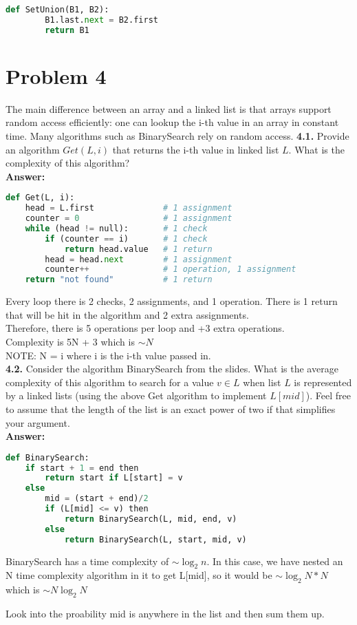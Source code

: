 \documentclass{article}
\begin{document}
\begin{lstlisting}[language=Python]
    def SetUnion(B1, B2):
        B1.last.next = B2.first
        return B1
\end{lstlisting}

\section*{Problem 4}
The main difference between an array and a linked list is that arrays support random access
efficiently: one can lookup the i-th value in an array in constant time. Many algorithms such as BinarySearch rely on random access.
 \textbf{4.1.} Provide an algorithm $Get(L,i)$ that returns the i-th value in linked list $L$. What is the complexity of this algorithm?\\

\noindent \textbf{Answer: }

\begin{lstlisting}[language=Python]
def Get(L, i):
    head = L.first              # 1 assignment
    counter = 0                 # 1 assignment
    while (head != null):       # 1 check
        if (counter == i)       # 1 check
            return head.value   # 1 return
        head = head.next        # 1 assignment
        counter++               # 1 operation, 1 assignment
    return "not found"          # 1 return
\end{lstlisting}

\noindent Every loop there is 2 checks, 2 assignments, and 1 operation. There is 1 return that will be hit in the algorithm and 2 extra assignments.\\
Therefore, there is 5 operations per loop and +3 extra operations.\\
Complexity is 5N + 3 which is $\sim N$\\
NOTE: N = i where i is the i-th value passed in.\\

\noindent
\textbf{4.2.} Consider the algorithm BinarySearch from the slides. What is the average complexity of this algorithm to search for a value $v \in L$  when list $L$ is represented by a linked lists (using the above Get algorithm to implement $L[mid]$). Feel free to assume that the length of the list is an exact power of two if that simplifies your argument.\\

\noindent \textbf{Answer: }

\begin{lstlisting}[language=Python]
def BinarySearch:
    if start + 1 = end then
        return start if L[start] = v
    else
        mid = (start + end)/2
        if (L[mid] <= v) then
            return BinarySearch(L, mid, end, v)
        else
            return BinarySearch(L, start, mid, v)
\end{lstlisting}

BinarySearch has a time complexity of $\sim \log_2n$. In this case, we have nested an N time complexity algorithm in it to get L[mid], so it would be $\sim \log_2N *N$ which is $\sim N\log_2N$

Look into the proability mid is anywhere in the list and then sum them up.
\end{document}

